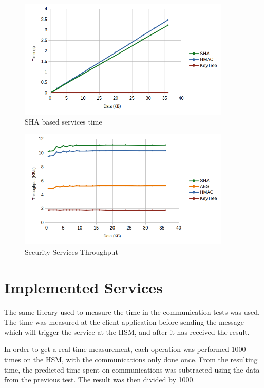 \begin{figure}[h!]
	\centering
	\includegraphics[width=0.9\textwidth]{./Images/sha-time-compare.png}
	\caption{SHA based services time}
	\label{fig:performance:sha:compare}
\end{figure}

\begin{figure}[h!]
	\centering
	\includegraphics[width=0.9\textwidth]{./Images/core-tput.png}
	\caption{Security Services Throughput}
	\label{fig:performance:cores:tput}
\end{figure}
\section{Implemented Services}\label{chap:evaluation:services}

The same library used to measure the time in the communication tests was used.
The time was measured at the client application before sending the message which will trigger the service at the HSM, and after it has received the result.

In order to get a real time measurement, each operation was performed 1000 times on the HSM, with the communications only done once.
From the resulting time, the predicted time spent on communications was subtracted using the data from the previous test. The result was then divided by 1000.

